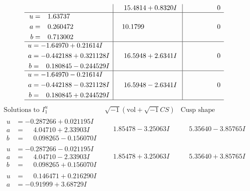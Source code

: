 \documentclass[1p]{elsarticle_modified}
\theoremstyle{definition}
\newcommand{\I}{\sqrt{-1}}
\begin{document}
$$\begin{array}{c|c|c}
 & \phantom{-}15.4814 + 0.8320 I & \phantom{-0.000000 } 0 \\ \hline\begin{aligned}
u &= \phantom{-}1.63737\phantom{ +0.000000I} \\
a &= \phantom{-}0.260472\phantom{ +0.000000I} \\
b &= \phantom{-}0.713002\phantom{ +0.000000I}\end{aligned}
 & \phantom{-}10.1799\phantom{ +0.000000I} & \phantom{-0.000000 } 0 \\ \hline\begin{aligned}
u &= -1.64970 + 0.21614 I \\
a &= -0.442188 + 0.321128 I \\
b &= \phantom{-}0.180845 - 0.244529 I\end{aligned}
 & \phantom{-}16.5948 + 2.6341 I & \phantom{-0.000000 } 0 \\ \hline\begin{aligned}
u &= -1.64970 - 0.21614 I \\
a &= -0.442188 - 0.321128 I \\
b &= \phantom{-}0.180845 + 0.244529 I\end{aligned}
 & \phantom{-}16.5948 - 2.6341 I & \phantom{-0.000000 } 0\\
 \hline 
 \end{array}$$\newpage$$\begin{array}{c|c|c}  
\text{Solutions to }I^u_{1}& \I (\text{vol} + \sqrt{-1}CS) & \text{Cusp shape}\\
 \hline 
\begin{aligned}
u &= -0.287266 + 0.021195 I \\
a &= \phantom{-}4.04710 + 2.33903 I \\
b &= \phantom{-}0.098265 - 0.156070 I\end{aligned}
 & \phantom{-}1.85478 - 3.25063 I & \phantom{-}5.35640 - 3.85765 I \\ \hline\begin{aligned}
u &= -0.287266 - 0.021195 I \\
a &= \phantom{-}4.04710 - 2.33903 I \\
b &= \phantom{-}0.098265 + 0.156070 I\end{aligned}
 & \phantom{-}1.85478 + 3.25063 I & \phantom{-}5.35640 + 3.85765 I \\ \hline\begin{aligned}
u &= \phantom{-}0.146471 + 0.216290 I \\
a &= -0.91999 + 3.68729 I \\

\end{aligned}
\end{array}$$
\end{document}
